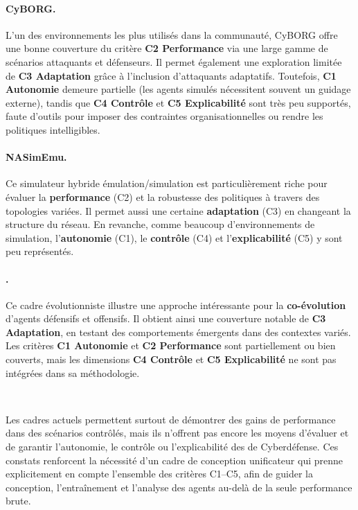 \paragraph{CyBORG.} L'un des environnements les plus utilisés dans la communauté, CyBORG offre une bonne couverture du critère \textbf{C2 Performance} via une large gamme de scénarios attaquants et défenseurs. Il permet également une exploration limitée de \textbf{C3 Adaptation} grâce à l'inclusion d'attaquants adaptatifs. Toutefois, \textbf{C1 Autonomie} demeure partielle (les agents simulés nécessitent souvent un guidage externe), tandis que \textbf{C4 Contrôle} et \textbf{C5 Explicabilité} sont très peu supportés, faute d'outils pour imposer des contraintes organisationnelles ou rendre les politiques intelligibles.

\paragraph{NASimEmu.} Ce simulateur hybride émulation/simulation est particulièrement riche pour évaluer la \textbf{performance} (C2) et la robustesse des politiques à travers des topologies variées. Il permet aussi une certaine \textbf{adaptation} (C3) en changeant la structure du réseau. En revanche, comme beaucoup d'environnements de simulation, l'\textbf{autonomie} (C1), le \textbf{contrôle} (C4) et l'\textbf{explicabilité} (C5) y sont peu représentés.

\paragraph{.} Ce cadre évolutionniste illustre une approche intéressante pour la \textbf{co-évolution} d'agents défensifs et offensifs. Il obtient ainsi une couverture notable de \textbf{C3 Adaptation}, en testant des comportements émergents dans des contextes variés. Les critères \textbf{C1 Autonomie} et \textbf{C2 Performance} sont partiellement ou bien couverts, mais les dimensions \textbf{C4 Contrôle} et \textbf{C5 Explicabilité} ne sont pas intégrées dans sa méthodologie.

\

\noindent Les cadres actuels permettent surtout de démontrer des gains de performance dans des scénarios contrôlés, mais ils n'offrent pas encore les moyens d'évaluer et de garantir l'autonomie, le contrôle ou l'explicabilité des  de Cyberdéfense. Ces constats renforcent la nécessité d'un cadre de conception unificateur qui prenne explicitement en compte l'ensemble des critères C1--C5, afin de guider la conception, l'entraînement et l'analyse des agents au-delà de la seule performance brute.

